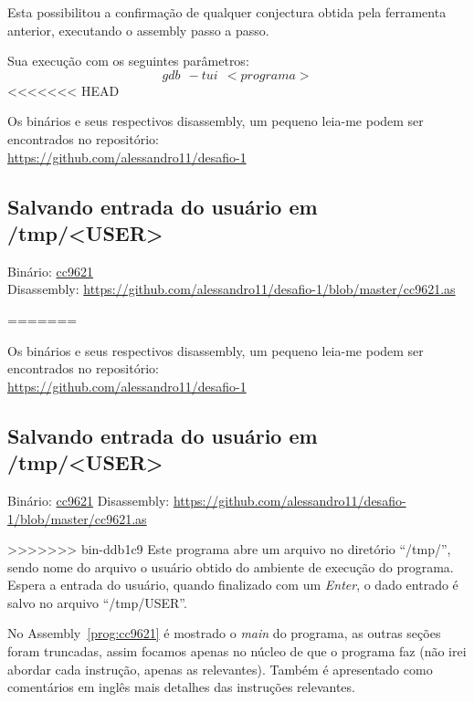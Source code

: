 Esta possibilitou a confirmação de qualquer conjectura obtida pela
ferramenta anterior, executando o assembly passo a passo.

Sua execução com os seguintes parâmetros:
$$gdb \ \ -tui \ \ <programa>$$
<<<<<<< HEAD

Os binários e seus respectivos disassembly, um pequeno leia-me podem
ser encontrados no repositório:\\

\href{https://github.com/alessandro11/desafio-1}{https://github.com/alessandro11/desafio-1}


\subsection{Salvando entrada do usuário em /tmp/<USER>}
\noindent Binário: \href{https://s3.amazonaws.com/chaordic-desafio-cloud/cc9621}{cc9621}\\
Disassembly: \href{https://github.com/alessandro11/desafio-1/blob/master/cc9621.as}{https://github.com/alessandro11/desafio-1/blob/master/cc9621.as}

=======

Os binários e seus respectivos disassembly, um pequeno leia-me podem
ser encontrados no repositório:\\

\href{https://github.com/alessandro11/desafio-1}{https://github.com/alessandro11/desafio-1}


\subsection{Salvando entrada do usuário em /tmp/<USER>}
Binário: \href{https://s3.amazonaws.com/chaordic-desafio-cloud/cc9621}{cc9621}
Disassembly:
\href{https://github.com/alessandro11/desafio-1/blob/master/cc9621.as}{https://github.com/alessandro11/desafio-1/blob/master/cc9621.as}

>>>>>>> bin-ddb1c9
Este programa abre um arquivo no diretório ``/tmp/'', sendo nome do
arquivo o usuário obtido do ambiente de execução do programa. Espera a
entrada do usuário, quando finalizado com um \emph{Enter}, o
dado entrado é salvo no arquivo ``/tmp/USER''.



No Assembly~\ref{prog:cc9621} é mostrado o \emph{main} do programa, as
outras seções foram truncadas, assim focamos apenas no núcleo de que o
programa faz (não irei abordar cada instrução, apenas as
relevantes). Também é apresentado como comentários em inglês mais
detalhes das instruções relevantes.

